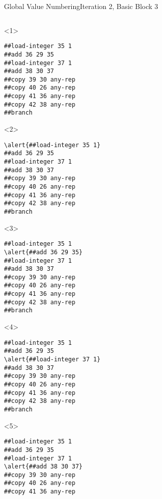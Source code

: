 \documentclass{beamer}
\begin{document}
\begin{frame}[fragile]{Global Value Numbering}{Iteration 2, Basic Block 3}
  \footnotesize
  \begin{columns}[t,onlytextwidth]
    \begin{column}[t]{.5\textwidth}
      \begin{onlyenv}<1>
        \begin{Verbatim}[frame=single,commandchars=\\\{\}]
##load-integer 35 1
##add 36 29 35
##load-integer 37 1
##add 38 30 37
##copy 39 30 any-rep
##copy 40 26 any-rep
##copy 41 36 any-rep
##copy 42 38 any-rep
##branch
        \end{Verbatim}
      \end{onlyenv}
      \begin{onlyenv}<2>
        \begin{Verbatim}[frame=single,commandchars=\\\{\}]
\alert{##load-integer 35 1}
##add 36 29 35
##load-integer 37 1
##add 38 30 37
##copy 39 30 any-rep
##copy 40 26 any-rep
##copy 41 36 any-rep
##copy 42 38 any-rep
##branch
        \end{Verbatim}
      \end{onlyenv}
      \begin{onlyenv}<3>
        \begin{Verbatim}[frame=single,commandchars=\\\{\}]
##load-integer 35 1
\alert{##add 36 29 35}
##load-integer 37 1
##add 38 30 37
##copy 39 30 any-rep
##copy 40 26 any-rep
##copy 41 36 any-rep
##copy 42 38 any-rep
##branch
        \end{Verbatim}
      \end{onlyenv}
      \begin{onlyenv}<4>
        \begin{Verbatim}[frame=single,commandchars=\\\{\}]
##load-integer 35 1
##add 36 29 35
\alert{##load-integer 37 1}
##add 38 30 37
##copy 39 30 any-rep
##copy 40 26 any-rep
##copy 41 36 any-rep
##copy 42 38 any-rep
##branch
        \end{Verbatim}
      \end{onlyenv}
      \begin{onlyenv}<5>
        \begin{Verbatim}[frame=single,commandchars=\\\{\}]
##load-integer 35 1
##add 36 29 35
##load-integer 37 1
\alert{##add 38 30 37}
##copy 39 30 any-rep
##copy 40 26 any-rep
##copy 41 36 any-rep

\end{Verbatim}
\end{onlyenv}
\end{column}
\end{columns}
\end{frame}
\end{document}
